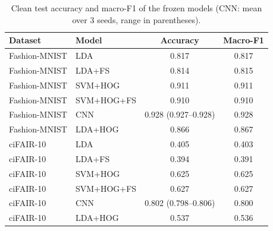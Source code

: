 \begin{table}[t]
\centering
\caption{Clean test accuracy and macro-F1 of the frozen models (CNN: mean over 3 seeds, range in parentheses).}
\label{tab:clean}
\small
\begin{tabular}{llcc}
\toprule
Dataset & Model & Accuracy & Macro-F1 \\
\midrule
Fashion-MNIST & LDA & 0.817 & 0.817 \\
Fashion-MNIST & LDA+FS & 0.814 & 0.815 \\
Fashion-MNIST & SVM+HOG & 0.911 & 0.911 \\
Fashion-MNIST & SVM+HOG+FS & 0.910 & 0.910 \\
Fashion-MNIST & CNN & 0.928 (0.927--0.928) & 0.928 \\
Fashion-MNIST & LDA+HOG & 0.866 & 0.867 \\
\midrule
ciFAIR-10 & LDA & 0.405 & 0.403 \\
ciFAIR-10 & LDA+FS & 0.394 & 0.391 \\
ciFAIR-10 & SVM+HOG & 0.625 & 0.625 \\
ciFAIR-10 & SVM+HOG+FS & 0.627 & 0.627 \\
ciFAIR-10 & CNN & 0.802 (0.798--0.806) & 0.800 \\
ciFAIR-10 & LDA+HOG & 0.537 & 0.536 \\
\bottomrule
\end{tabular}
\end{table}
